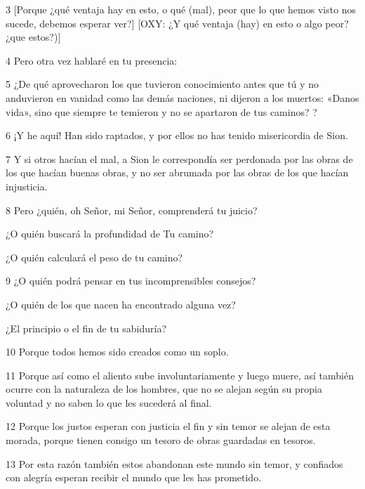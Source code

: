 \par 3 [Porque ¿qué ventaja hay en esto, o qué (mal), peor que lo que hemos visto nos sucede, debemos esperar ver?] [OXY: ¿Y qué ventaja (hay) en esto o algo peor? ¿que estos?)]

\par 4 Pero otra vez hablaré en tu presencia:

\par 5 ¿De qué aprovecharon los que tuvieron conocimiento antes que tú y no anduvieron en vanidad como las demás naciones, ni dijeron a los muertos: «Danos vida», sino que siempre te temieron y no se apartaron de tus caminos? ?

\par 6 ¡Y he aquí! Han sido raptados, y por ellos no has tenido misericordia de Sion.

\par 7 Y si otros hacían el mal, a Sion le correspondía ser perdonada por las obras de los que hacían buenas obras, y no ser abrumada por las obras de los que hacían injusticia.

\par 8 Pero ¿quién, oh Señor, mi Señor, comprenderá tu juicio?

\par ¿O quién buscará la profundidad de Tu camino?

\par ¿O quién calculará el peso de tu camino?

\par 9 ¿O quién podrá pensar en tus incomprensibles consejos?

\par ¿O quién de los que nacen ha encontrado alguna vez?

\par ¿El principio o el fin de tu sabiduría?


\par 10 Porque todos hemos sido creados como un soplo.

\par 11 Porque así como el aliento sube involuntariamente y luego muere, así también ocurre con la naturaleza de los hombres, que no se alejan según su propia voluntad y no saben lo que les sucederá al final.

\par 12 Porque los justos esperan con justicia el fin y sin temor se alejan de esta morada, porque tienen consigo un tesoro de obras guardadas en tesoros.

\par 13 Por esta razón también estos abandonan este mundo sin temor, y confiados con alegría esperan recibir el mundo que les has prometido.

